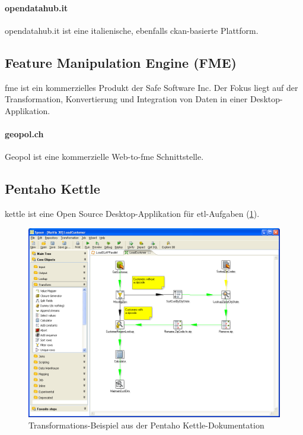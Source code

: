 \paragraph{opendatahub.it}
opendatahub.it ist eine italienische, ebenfalls \gls{ckan}-basierte Plattform.

\subsection{Feature Manipulation Engine (FME)}
\gls{fme} ist ein kommerzielles Produkt der Safe Software Inc. Der Fokus liegt auf der Transformation, Konvertierung und Integration von Daten in einer Desktop-Applikation.

\paragraph{geopol.ch}
Geopol ist eine kommerzielle Web-to-\acs{fme} Schnittstelle.

\subsection{Pentaho Kettle}
\gls{kettle} ist eine Open Source Desktop-Applikation für \acs{etl}-Aufgaben (\cref{fig:tb:kettle}).

\begin{figure}[H]
    \centering
    \includegraphics[width=2\linewidth/3]{fig/kettle-spoon-transformation}
    \caption{Transformations-Beispiel aus der Pentaho Kettle-Dokumentation}
    \label{fig:tb:kettle}
\end{figure}

